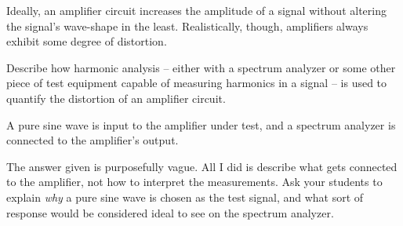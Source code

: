 

Ideally, an amplifier circuit increases the amplitude of a signal without altering the signal's wave-shape in the least.  Realistically, though, amplifiers always exhibit some degree of distortion.  

Describe how harmonic analysis -- either with a spectrum analyzer or some other piece of test equipment capable of measuring harmonics in a signal -- is used to quantify the distortion of an amplifier circuit.







A pure sine wave is input to the amplifier under test, and a spectrum analyzer is connected to the amplifier's output.







The answer given is purposefully vague.  All I did is describe what gets connected to the amplifier, not how to interpret the measurements.  Ask your students to explain {\it why} a pure sine wave is chosen as the test signal, and what sort of response would be considered ideal to see on the spectrum analyzer.




